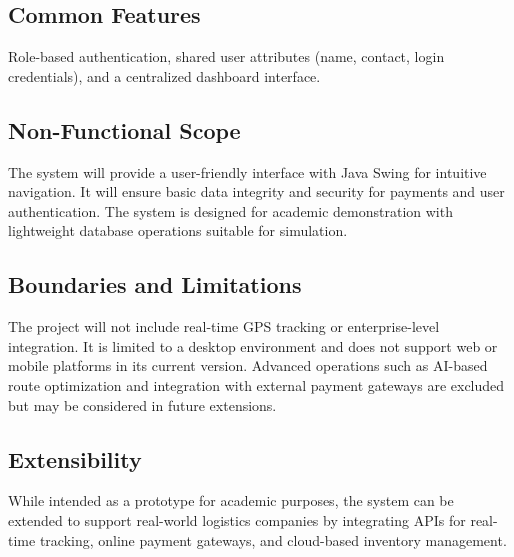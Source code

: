 \documentclass[12pt,a4paper]{article}
\begin{document}
\subsection*{Common Features}
Role-based authentication, shared user attributes (name, contact, login credentials), and a centralized dashboard interface.

\subsection*{Non-Functional Scope}
The system will provide a user-friendly interface with Java Swing for intuitive navigation. It will ensure basic data integrity and security for payments and user authentication. The system is designed for academic demonstration with lightweight database operations suitable for simulation.

\subsection*{Boundaries and Limitations}
The project will not include real-time GPS tracking or enterprise-level integration. It is limited to a desktop environment and does not support web or mobile platforms in its current version. Advanced operations such as AI-based route optimization and integration with external payment gateways are excluded but may be considered in future extensions.

\subsection*{Extensibility}
While intended as a prototype for academic purposes, the system can be extended to support real-world logistics companies by integrating APIs for real-time tracking, online payment gateways, and cloud-based inventory management.
\end{document}
